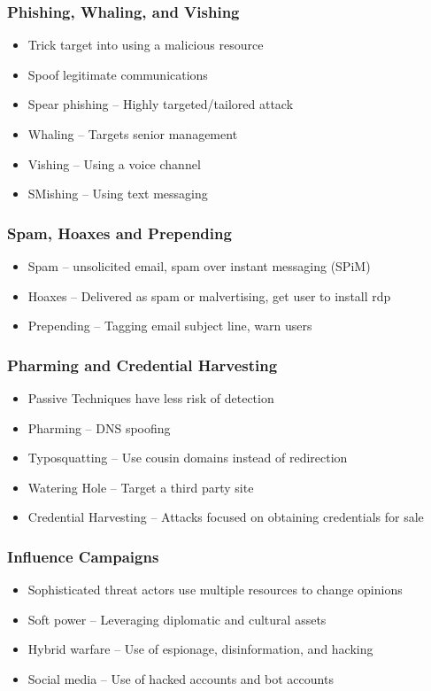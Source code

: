 		\subsubsection {Phishing, Whaling, and Vishing}
			\begin{itemize}
				\item Trick target into using a malicious resource
				\item Spoof legitimate communications
				\item Spear phishing -- Highly targeted/tailored attack
				\item Whaling -- Targets senior management
				\item Vishing -- Using a voice channel
				\item SMishing -- Using text messaging
			\end{itemize}
		\subsubsection {Spam, Hoaxes and Prepending}
			\begin{itemize}
				\item Spam -- unsolicited email, spam over instant messaging (SPiM)
				\item Hoaxes -- Delivered as spam or malvertising, get user to install rdp
				\item Prepending -- Tagging email subject line, warn users
			\end{itemize}
		\subsubsection {Pharming and Credential Harvesting}
			\begin{itemize}
				\item Passive Techniques have less risk of detection
				\item Pharming -- DNS spoofing
				\item Typosquatting -- Use cousin domains instead of redirection
				\item Watering Hole -- Target a third party site
				\item Credential Harvesting -- Attacks focused on obtaining credentials
					for sale
			\end{itemize}
		\subsubsection {Influence Campaigns}
			\begin{itemize}
				\item Sophisticated threat actors use multiple resources to change opinions
				\item Soft power -- Leveraging diplomatic and cultural assets
				\item Hybrid warfare -- Use of espionage, disinformation, and hacking
				\item Social media -- Use of hacked accounts and bot accounts
			\end{itemize}
